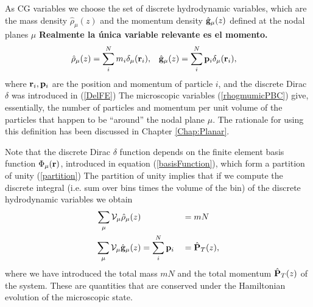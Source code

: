 \documentclass[b5paper,openright,10pt]{book}
\newcommand{\Note}[1]{{\bf \color{red}#1}}    %
\begin{document}
As CG variables we choose  the set of discrete hydrodynamic
variables,  which are  the  mass density  $\hat{\rho}_\mu(z)$ and  the
momentum  density $\hat{\bf  g}_\mu(z)$  defined at  the nodal  planes
$\mu$   \Note{Realmente la única variable relevante es el momento.}
\begin{align}
  \hat{\rho}_\mu(z)&= \sum_i^Nm_i\delta_\mu({\bf r}_i),&
\hat{\bf g}_\mu(z)&= \sum_i^N{\bf p}_i\delta_\mu({\bf r}_i),
\label{rhogmumicPBC}
\end{align}
where ${\bf r}_i,{\bf p}_i$ are the position and momentum of particle $i$, and the discrete Dirac $\delta$ was introduced in (\ref{DelFE})
The  microscopic  variables  (\ref{rhogmumicPBC})  give,
essentially, the number  of particles and momentum per  unit volume of
the particles that happen to be ``around'' the nodal plane $\mu$.  The rationale for using this definition has been discussed in Chapter \ref{Chap:Planar}.


Note that the discrete Dirac $\delta$ function depends on the finite  element basis  function $\Phi_\mu({\bf  r})$, introduced in equation (\ref{basisFunction}), which form a
partition of unity (\ref{partition})
The  partition  of unity  implies  that  if  we compute  the  discrete
integral  (i.e. sum  over bins  times the  volume of  the bin)  of the
discrete hydrodynamic variables we obtain
\begin{align}
  \sum_\mu{\cal V}_\mu\hat{\rho}_\mu(z)&  &&= mN
\nonumber\\
  \sum_\mu{\cal V}_\mu\hat{\bf g}_\mu(z)&=\sum_i^N{\bf p}_i&&= \hat{\bf P}_T(z),
\label{DiscCons}
\end{align}
where we  have introduced the total  mass $mN$ and the  total momentum
$\hat{\bf  P}_T(z)$ of  the  system.  These  are  quantities that  are
conserved under  the Hamiltonian  evolution of the  microscopic state.
\end{document}
